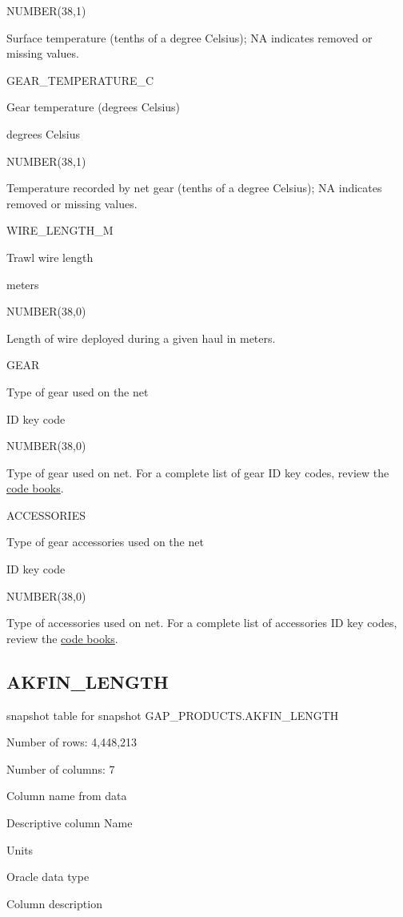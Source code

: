 \documentclass[
  letterpaper,
  oneside,
  open=any]{scrbook}
\begin{document}
NUMBER(38,1)

Surface temperature (tenths of a degree Celsius); NA indicates removed
or missing values.

GEAR\_TEMPERATURE\_C

Gear temperature (degrees Celsius)

degrees Celsius

NUMBER(38,1)

Temperature recorded by net gear (tenths of a degree Celsius); NA
indicates removed or missing values.

WIRE\_LENGTH\_M

Trawl wire length

meters

NUMBER(38,0)

Length of wire deployed during a given haul in meters.

GEAR

Type of gear used on the net

ID key code

NUMBER(38,0)

Type of gear used on net. For a complete list of gear ID key codes,
review the
\href{https://www.fisheries.noaa.gov/resource/document/groundfish-survey-species-code-manual-and-data-codes-manual}{code
books}.

ACCESSORIES

Type of gear accessories used on the net

ID key code

NUMBER(38,0)

Type of accessories used on net. For a complete list of accessories ID
key codes, review the
\href{https://www.fisheries.noaa.gov/resource/document/groundfish-survey-species-code-manual-and-data-codes-manual}{code
books}.

\subsection{AKFIN\_LENGTH}\label{akfin_length}

snapshot table for snapshot GAP\_PRODUCTS.AKFIN\_LENGTH

Number of rows: 4,448,213

Number of columns: 7

Column name from data

Descriptive column Name

Units

Oracle data type

Column description
\end{document}
